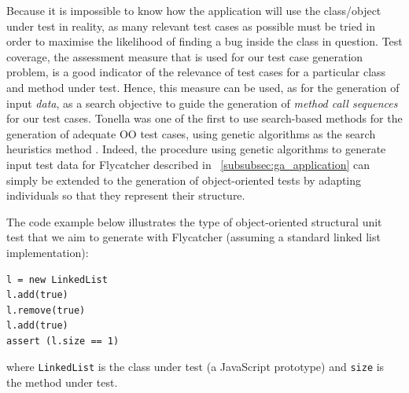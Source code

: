 \documentclass[a4paper,11pt,titlepage]{report}
\begin{document}
Because it is impossible to know how the application will use the class/object under test in reality, as many relevant test cases as possible must be tried in order to maximise the likelihood of finding a bug inside the class in question. Test coverage, the assessment measure that is used for our test case generation problem, is a good indicator of the relevance of test cases for a particular class and method under test. Hence, this measure can be used, as for the generation of input \emph{data}, as a search objective to guide the generation of \emph{method call sequences} for our test cases. Tonella was one of the first to use search-based methods for the generation of adequate OO test cases, using genetic algorithms as the search heuristics method \cite{tonella2004evolutionary}. Indeed, the procedure using genetic algorithms to generate input test data for \textsf{Flycatcher} described in ~\ref{subsubsec:ga_application} can simply be extended to the generation of object-oriented tests by adapting individuals so that they represent their structure.

The code example below illustrates the type of object-oriented structural unit test that we aim to generate with \textsf{Flycatcher} (assuming a standard linked list implementation):

\begin{verbatim}
l = new LinkedList
l.add(true)
l.remove(true)
l.add(true)
assert (l.size == 1)
\end{verbatim}

where \texttt{LinkedList} is the class under test (a JavaScript prototype) and \texttt{size} is the method under test.



\end{document}
